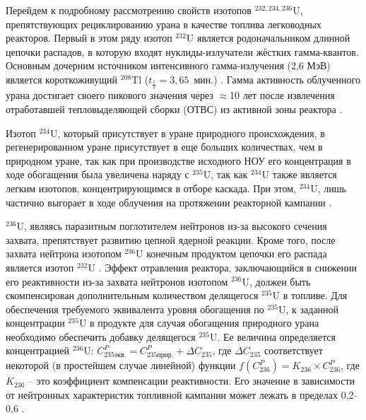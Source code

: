 Перейдем к подробному рассмотрению свойств изотопов $^{232,234,236}$U, препятствующих рециклированию урана в качестве топлива легководных реакторов.
Первый в этом ряду изотоп $^{232}$U является родоначальником длинной цепочки распадов, в которую входят нуклиды-излучатели жёстких гамма-квантов.
Основным дочерним источником интенсивного гамма-излучения (2,6 МэВ) является короткоживущий $^{208}$Tl ($t_{\frac{1}{2}}=3,65$ мин.) \cite{matveevUran232EgoVliyanie1985,abbasProliferationResistanceFeatures2013}. Гамма активность облученного урана достигает своего пикового значения через $\approx$10 лет после извлечения отработавшей тепловыделяющей сборки (ОТВС) из активной зоны реактора \cite{gresleyEnrichingRecyclingUranium1988}.

Изотоп $^{234}$U, который присутствует в уране природного происхождения, в регенерированном уране присутствует в еще больших количествах, чем в природном уране, так как при производстве исходного НОУ его концентрация в ходе обогащения была увеличена наряду с $^{235}$U, так как $^{234}$U также является легким изотопов, концентрирующимся в отборе каскада. При этом, $^{234}$U, лишь частично выгорает в ходе облучения на протяжении реакторной кампании \cite{gresleyEnrichingRecyclingUranium1988}.

$^{236}$U, являясь паразитным поглотителем нейтронов из-за высокого сечения захвата, препятствует развитию цепной ядерной реакции. Кроме того, после захвата нейтрона изотопом  $^{236}$U конечным продуктом цепочки его распада является изотоп  $^{232}$U \cite{ksenofontovIssledovanieProblemyVovlecheniya1988}.
Эффект отравления реактора, заключающийся в снижении его реактивности из-за захвата нейтронов изотопом  $^{236}$U, должен быть скомпенсирован дополнительным количеством делящегося $^{235}$U в топливе. Для обеспечения требуемого эквивалента уровня обогащения по $^{235}$U, к заданной концентрации $^{235}$U в продукте для случая обогащения природного урана необходимо обеспечить добавку делящегося $^{235}$U.
Ее величина определяется концентрацией $^{236}$U:
$C_{235 экв.}^{P}=C_{235 прир.}^{P}+\Delta C_{235}$, где $\Delta C_{235}$ соответствует некоторой (в простейшем случае линейной) функции  $f(C_{236}^{P})=K_{236} \times C_{236}^{P}$, где $K_{236}$ -- это коэффициент компенсации реактивности. Его значение в зависимости от нейтронных характеристик топливной кампании может лежать в пределах 0,2--0,6 \cite{delagarzaMulticomponentIsotopeSeparation1961, delculAnalysisReuseUranium2009}. 

